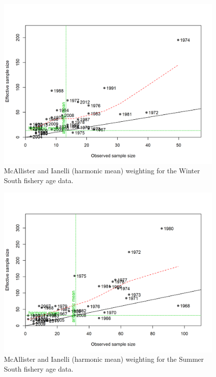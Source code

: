 \documentclass[12pt,]{article}
\begin{document}
\FloatBarrier

\begin{figure}
\centering
\includegraphics{r4ss/plots_mod1/comp_agefit_sampsize_flt3mkt2.png}
\caption{McAllister and Ianelli (harmonic mean) weighting for the Winter
South fishery age data. \label{fig:harm_mean_ws_age}}
\end{figure}

\FloatBarrier

\begin{figure}
\centering
\includegraphics{r4ss/plots_mod1/comp_agefit_sampsize_flt4mkt2.png}
\caption{McAllister and Ianelli (harmonic mean) weighting for the Summer
South fishery age data. \label{fig:harm_mean_wn_age}}
\end{figure}
\end{document}
